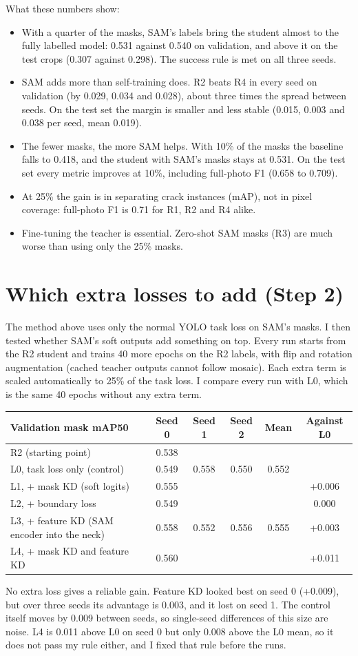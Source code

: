 \documentclass[11pt,a4paper]{article}
\begin{document}
What these numbers show:
\begin{itemize}
\item With a quarter of the masks, SAM's labels bring the student almost to the fully labelled model: 0.531 against 0.540 on validation,
and above it on the test crops (0.307 against 0.298). The success rule is met on all three seeds.
\item SAM adds more than self-training does. R2 beats R4 in every seed on validation (by 0.029, 0.034 and 0.028), about three times the
spread between seeds. On the test set the margin is smaller and less stable (0.015, 0.003 and 0.038 per seed, mean 0.019).
\item The fewer masks, the more SAM helps. With 10\% of the masks the baseline falls to 0.418, and the student with SAM's masks stays at 0.531.
On the test set every metric improves at 10\%, including full-photo F1 (0.658 to 0.709).
\item At 25\% the gain is in separating crack instances (mAP), not in pixel coverage: full-photo F1 is 0.71 for R1, R2 and R4 alike.
\item Fine-tuning the teacher is essential. Zero-shot SAM masks (R3) are much worse than using only the 25\% masks.
\end{itemize}

\section{Which extra losses to add (Step 2)}
The method above uses only the normal YOLO task loss on SAM's masks. I then tested whether SAM's soft outputs add something on top.
Every run starts from the R2 student and trains 40 more epochs on the R2 labels, with flip and rotation augmentation
(cached teacher outputs cannot follow mosaic). Each extra term is scaled automatically to 25\% of the task loss.
I compare every run with L0, which is the same 40 epochs without any extra term.
\begin{center}\small
\begin{tabular}{lccccc}
\toprule
Validation mask mAP50 & Seed 0 & Seed 1 & Seed 2 & Mean & Against L0\\
\midrule
R2 (starting point) & 0.538 & & & & \\
L0, task loss only (control) & 0.549 & 0.558 & 0.550 & 0.552 & \\
L1, + mask KD (soft logits) & 0.555 & & & & +0.006\\
L2, + boundary loss & 0.549 & & & & 0.000\\
L3, + feature KD (SAM encoder into the neck) & 0.558 & 0.552 & 0.556 & 0.555 & +0.003\\
L4, + mask KD and feature KD & 0.560 & & & & +0.011\\
\bottomrule
\end{tabular}\end{center}
No extra loss gives a reliable gain. Feature KD looked best on seed 0 (+0.009), but over three seeds its advantage is 0.003, and it lost on
seed 1. The control itself moves by 0.009 between seeds, so single-seed differences of this size are noise. L4 is 0.011 above L0 on seed 0
but only 0.008 above the L0 mean, so it does not pass my rule either, and I fixed that rule before the runs.
\end{document}
